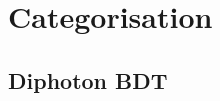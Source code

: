 \chapter{Categorisation}
\label{chap:categorisation}


\section{Diphoton BDT}
\label{cat:sec:dipho_bdt}

